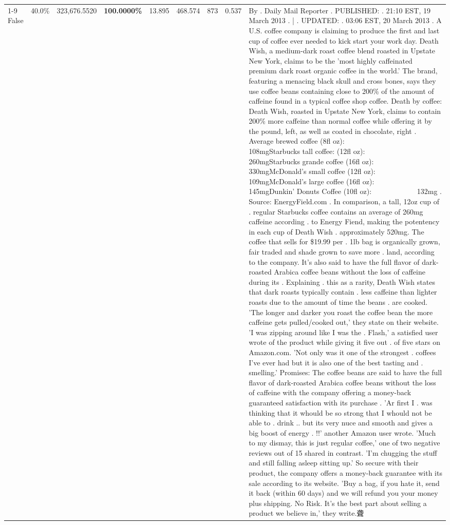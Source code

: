 \begin{table}[H]
{\begin{tabular}{lllrlllll}
\cline{1-9}
False & 40.0\% & 323,676.5520 & \bfseries \color{red} 100.0000\% & 13.895 & 468.574 & 873 & 0.537 & By . Daily Mail Reporter . PUBLISHED: . 21:10 EST, 19 March 2013 . | . UPDATED: . 03:06 EST, 20 March 2013 . A U.S. coffee company is claiming to produce the first and last cup of coffee ever needed to kick start your work day. Death Wish, a medium-dark roast coffee blend roasted in Upstate New York, claims to be the 'most highly caffeinated premium dark roast organic coffee in the world.' The brand, featuring a menacing black skull and cross bones, says they use coffee beans containing close to 200\% of the amount of caffeine found in a typical coffee shop coffee. Death by coffee: Death Wish, roasted in Upstate New York, claims to contain 200\% more caffeine than normal coffee while offering it by the pound, left, as well as coated in chocolate, right . Average brewed coffee (8fl oz):              108mgStarbucks tall coffee: (12fl oz):                260mgStarbucks grande coffee (16fl oz):         330mgMcDonald's small coffee (12fl oz):           109mgMcDonald's large coffee (16fl oz):           145mgDunkin' Donuts Coffee (10fl oz):             132mg . Source: EnergyField.com . In comparison, a tall, 12oz cup of . regular Starbucks coffee contains an average of 260mg caffeine according . to Energy Fiend, making the potentency in each cup of Death Wish . approximately 520mg. The coffee that sells for \$19.99 per . 1lb bag is organically grown, fair traded and shade grown to save more . land, according to the company. It's also said to have the full flavor of dark-roasted Arabica coffee beans without the loss of caffeine during its . Explaining . this as a rarity, Death Wish states that dark roasts typically contain . less caffeine than lighter roasts due to the amount of time the beans . are cooked. 'The longer and darker you roast the coffee bean the more caffeine gets pulled/cooked out,' they state on their website. 'I was zipping around like I was the . Flash,' a satisfied user wrote of the product while giving it five out . of five stars on Amazon.com. 'Not only was it one of the strongest . coffees I've ever had but it is also one of the best tasting and . smelling.’ Promises: The coffee beans are said to have the full flavor of dark-roasted Arabica coffee beans without the loss of caffeine with the company offering a money-back guaranteed satisfaction with its purchase . 'Ar first I . was thinking that it whould be so strong that I whould not be able to . drink .. but its very nuce and smooth and gives a big boost of energy . !!' another Amazon user wrote. 'Much to my dismay, this is just regular coffee,' one of two negative reviews out of 15 shared in contrast. 'I'm chugging the stuff and still falling asleep sitting up.' So secure with their product, the company offers a money-back guarantee with its sale according to its website. 'Buy a bag, if you hate it, send it back (within 60 days) and we will refund you your money plus shipping. No Risk. It’s the best part about selling a product we believe in,' they write.聋 \\

\end{tabular}}
\end{table}

